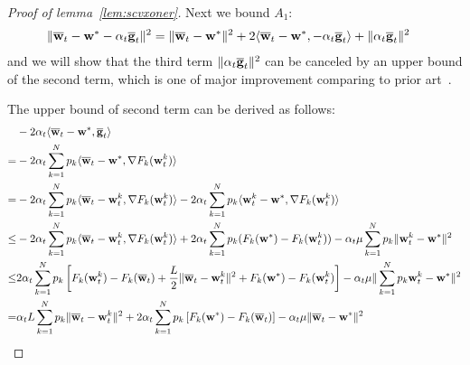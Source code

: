 \begin{proof}[Proof of lemma~\ref{lem:scvxoner}]
	Next we bound $A_{1}$: 
	\begin{align*}
	\|{\overline{\mathbf{w}}}_{t}-{\mathbf{w}}^{\ast}-\alpha_{t}{\overline{\mathbf{g}}}_{t}\|^{2} & =\|{\overline{\mathbf{w}}}_{t}-{\mathbf{w}}^{\ast}\|^{2}+2\langle{\overline{\mathbf{w}}}_{t}-{\mathbf{w}}^{\ast},-\alpha_{t}{\overline{\mathbf{g}}}_{t}\rangle+\|\alpha_{t}{\overline{\mathbf{g}}}_{t}\|^{2}
	\end{align*}
	and we will show that the third term $\|\alpha_{t}{\overline{\mathbf{g}}}_{t}\|^{2}$
	can be canceled by an upper bound of the second term, which is one of major improvement comparing to prior art~\cite{li2019convergence}.
	\begin{comment}
	The last term is straightforward to bound by the convexity of $\|\cdot\|^{2}$
	and $L$-smoothness of $F_{k}$,
	\begin{align*}
	\alpha_{t}^{2}\|\ov{g}_{t}\|^{2} & \leq\alpha_{t}^{2}\sum_{k=1}^{N}p_{k}\|\nabla F_{k}(\vw_{t}^{k})\|^{2}\leq2L\alpha_{t}^{2}\sum_{k=1}^{N}p_{k}(F_{k}(\vw_{t}^{k})-F_{k}^{\ast})
	\end{align*}
	or 
	\begin{align*}
	\alpha_{t}^{2}\|\ov{g}_{t}\|^{2} & \leq\alpha_{t}^{2}\sum_{k=1}^{N}p_{k}\|\nabla F_{k}(\vw_{t}^{k})\|^{2}\leq\alpha_{t}^{2}\sum_{k=1}^{N}p_{k}\mathbb{E}\|\nabla F_{k}(\vw_{t}^{k},\mathbf{\xi}_{t}^{k})\|^{2}\leq\alpha_{t}^{2}G^{2}
	\end{align*}
	\end{comment}
	The upper bound of second term can be derived as follows:
	\begin{align*}
	& -2\alpha_{t}\langle\ov{w}_{t}-\vw^{\ast},\ov{g}_{t}\rangle\\
	=& -2\alpha_{t}\sum_{k=1}^{N}p_{k}\langle\ov{w}_{t}-\vw^{\ast},\nabla F_{k}(\vw_{t}^{k})\rangle\\
	=& -2\alpha_{t}\sum_{k=1}^{N}p_{k}\langle\ov{w}_{t}-\vw_{t}^{k},\nabla F_{k}(\vw_{t}^{k})\rangle-2\alpha_{t}\sum_{k=1}^{N}p_{k}\langle \vw_{t}^{k}-\vw^{\ast},\nabla F_{k}(\vw_{t}^{k})\rangle\\
	\leq&-2\alpha_{t}\sum_{k=1}^{N}p_{k}\langle\ov{w}_{t}-\vw_{t}^{k},\nabla F_{k}(\vw_{t}^{k})\rangle+2\alpha_{t}\sum_{k=1}^{N}p_{k}(F_{k}(\vw^{\ast})-F_{k}(\vw_{t}^{k}))-\alpha_{t}\mu\sum_{k=1}^{N}p_{k}\|\vw_{t}^{k}-\vw^{\ast}\|^{2}\\
	\leq& 2\alpha_{t}\sum_{k=1}^{N}p_{k}\left[F_{k}(\vw_{t}^{k})-F_{k}(\ov{w}_{t})+\frac{L}{2}\|\ov{w}_{t}-\vw_{t}^{k}\|^{2}+F_{k}(\vw^{\ast})-F_{k}(\vw_{t}^{k})\right]-\alpha_{t}\mu\|\sum_{k=1}^{N}p_{k}\vw_{t}^{k}-\vw^{\ast}\|^{2}\\
	=& \alpha_{t}L\sum_{k=1}^{N}p_{k}\|\ov{w}_{t}-\vw_{t}^{k}\|^{2}+2\alpha_{t}\sum_{k=1}^{N}p_{k}\left[F_{k}(\vw^{\ast})-F_{k}(\ov{w}_{t})\right]-\alpha_{t}\mu\|\ov{w}_{t}-\vw^{\ast}\|^{2}

\end{align*}
\end{proof}
